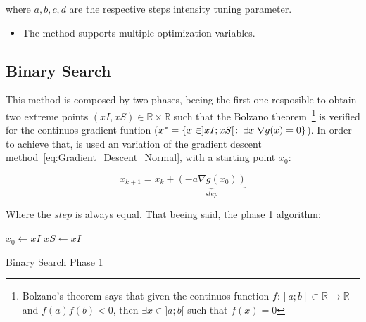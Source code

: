 where \(a, b, c, d\) are the respective steps intensity tuning parameter. \\




\begin{tcolorbox}[colback=blue!5!white,colframe=blue!35!white,title=Notes:]
\begin{itemize}
    \item The method supports multiple optimization variables.
\end{itemize}
\end{tcolorbox} 









\subsection{Binary Search}
\label{subsec:Binary_Search}

This method is composed by two phases, beeing the first one resposible to obtain two extreme points \((xI,xS) \in \mathbb{R} \times \mathbb{R}\) such that the Bolzano theorem~\footnote{Bolzano's theorem says that given the continuos function \(f:[a;b] \subset \mathbb{R} \to \mathbb{R}\) and \(f(a)f(b) < 0\), then \(\exists x \in  ]a; b[\) such that \(f(x) = 0\)} is verified for the continuos gradient funtion (\(  x^*= \{ x \in ]xI; xS[ \hspace{0.1em}  : \hspace{0.25em} \exists x \hspace{0.25em}\nabla g(x) = 0 \} \)). In order to achieve that, is used an variation of the gradient descent method~\ref{eq:Gradient_Descent_Normal}, with a starting point \(x_0\):

\begin{equation}
    x_{k+1} = x_k + \underbrace{(- a \nabla g(x_0))}_{step}
    \label{eq:Binary_Search_Phase1_gradDesc}
\end{equation}

Where the \(step\) is always equal. That beeing said, the phase 1 algorithm: 

  \begin{algorithm}
    $x_0\gets xI$\;
    $xS\gets xI$\;
    \caption{Binary Search Phase 1} \label{alg:Binary_Search_Phase_1}
  \end{algorithm}


